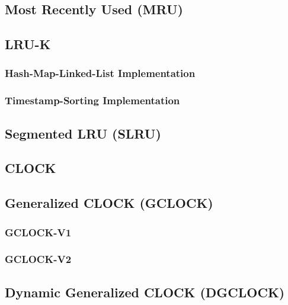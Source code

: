 \subsection[MRU]{Most Recently Used (MRU)} \label{subsec:mru}

\subsection[LRU-K]{LRU-K} \label{subsec:lru-k}

\subsubsection{Hash-Map-Linked-List Implementation} \label{subsubsec:lru-k_traditional}

\subsubsection{Timestamp-Sorting Implementation} \label{subsubsec:lru-k_timestamp}

\subsection[SLRU]{Segmented LRU (SLRU)} \label{subsec:slru}

\subsection[CLOCK]{CLOCK} \label{subsec:clock}

\subsection[GCLOCK]{Generalized CLOCK (GCLOCK)} \label{subsec:gclock}

\subsubsection[GCLOCK-V1]{GCLOCK-V1} \label{subsubsec:gclock-v1}

\subsubsection[GCLOCK-V2]{GCLOCK-V2} \label{subsubsec:gclock-v2}

\subsection[DGCLOCK]{Dynamic Generalized CLOCK (DGCLOCK)} \label{subsec:dgclock}

